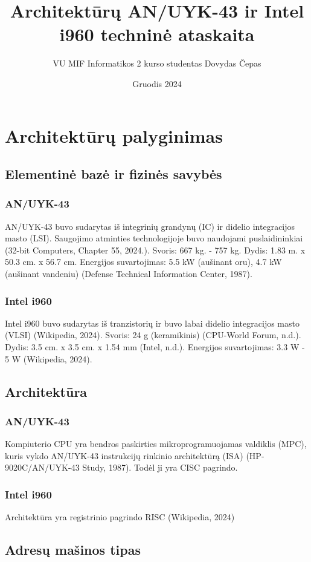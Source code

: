 \documentclass{article}
\title{Architektūrų AN/UYK-43 ir Intel i960 techninė ataskaita}
\author{VU MIF Informatikos 2 kurso studentas Dovydas Čepas}
\date{Gruodis 2024}
\begin{document}
\maketitle
\newpage
\section{Architektūrų palyginimas}
\subsection{Elementinė bazė ir fizinės savybės}
\subsubsection{AN/UYK-43}
AN/UYK-43 buvo sudarytas iš integrinių grandynų (IC) ir didelio integracijos masto (LSI). Saugojimo atminties technologijoje buvo naudojami puslaidininkiai (32-bit Computers, Chapter 55, 2024.). Svoris: 667 kg. - 757 kg. Dydis: 1.83 m. x 50.3 cm. x 56.7 cm. Energijos suvartojimas: 5.5 kW (aušinant oru), 4.7 kW (aušinant vandeniu) (Defense Technical Information Center, 1987).

\subsubsection{Intel i960}
Intel i960 buvo sudarytas iš tranzistorių ir buvo labai didelio integracijos masto (VLSI) (Wikipedia, 2024). Svoris: 24 g (keramikinis) (CPU-World Forum, n.d.). Dydis: 3.5 cm. x 3.5 cm. x 1.54 mm (Intel, n.d.). Energijos suvartojimas: 3.3 W - 5 W (Wikipedia, 2024).

\subsection{Architektūra}
\subsubsection{AN/UYK-43}
Kompiuterio CPU yra bendros paskirties mikroprogramuojamas valdiklis (MPC), kuris vykdo AN/UYK-43 instrukcijų rinkinio architektūrą (ISA) (HP-9020C/AN/UYK-43 Study, 1987). Todėl ji yra CISC pagrindo.
\subsubsection{Intel i960}
Architektūra yra registrinio pagrindo RISC (Wikipedia, 2024)
\subsection{Adresų mašinos tipas}
\end{document}
